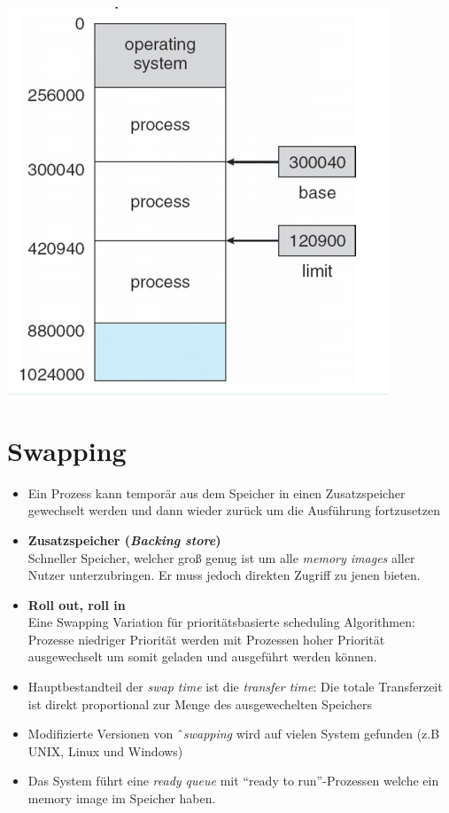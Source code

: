 \documentclass[a4paper]{scrreprt}
\begin{document}
\begin{center}
\includegraphics[scale=0.5]{graphics/baseandlimitprotection.png}
\end{center}


\section{Swapping}
\begin{itemize}
\item Ein Prozess kann temporär aus dem Speicher in einen Zusatzspeicher gewechselt werden und dann wieder zurück um die Ausführung fortzusetzen
\item \textbf{Zusatzspeicher (\textit{Backing store})} \ \\ Schneller Speicher, welcher groß genug ist um alle \textit{memory images} aller Nutzer unterzubringen. Er muss jedoch direkten Zugriff zu jenen bieten.
\item \textbf{Roll out, roll in} \ \\ Eine Swapping Variation für prioritätsbasierte scheduling Algorithmen: Prozesse niedriger Priorität werden mit Prozessen hoher Priorität ausgewechselt um somit geladen und ausgeführt werden können.
\item Hauptbestandteil der \textit{swap time} ist die \textit{transfer time}: Die totale Transferzeit ist direkt proportional zur Menge des ausgewechelten Speichers
\item Modifizierte Versionen von ˆ\textit{swapping} wird auf vielen System gefunden (z.B UNIX, Linux und Windows)
\item Das System führt eine \textit{ready queue} mit "`ready to run"'-Prozessen welche ein memory image im Speicher haben.

\end{itemize}
\end{document}
